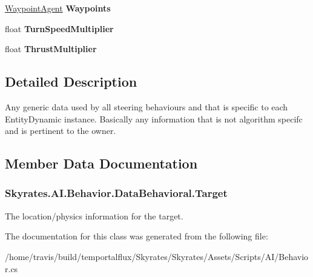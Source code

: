 \begin{DoxyCompactItemize}
\item 
\hypertarget{class_skyrates_1_1_a_i_1_1_behavior_1_1_data_behavioral_a592189455ad128ed20c327e80a13abb6}{\hyperlink{class_skyrates_1_1_a_i_1_1_target_1_1_waypoint_agent}{Waypoint\-Agent} {\bfseries Waypoints}}\label{class_skyrates_1_1_a_i_1_1_behavior_1_1_data_behavioral_a592189455ad128ed20c327e80a13abb6}

\item 
\hypertarget{class_skyrates_1_1_a_i_1_1_behavior_1_1_data_behavioral_a8cbef5bf7accdbe60002994848129e3a}{float {\bfseries Turn\-Speed\-Multiplier}}\label{class_skyrates_1_1_a_i_1_1_behavior_1_1_data_behavioral_a8cbef5bf7accdbe60002994848129e3a}

\item 
\hypertarget{class_skyrates_1_1_a_i_1_1_behavior_1_1_data_behavioral_ab43949c0e7564921d94fec9e3c97f107}{float {\bfseries Thrust\-Multiplier}}\label{class_skyrates_1_1_a_i_1_1_behavior_1_1_data_behavioral_ab43949c0e7564921d94fec9e3c97f107}

\end{DoxyCompactItemize}


\subsection{Detailed Description}
Any generic data used by all steering behaviours and that is specific to each Entity\-Dynamic instance. Basically any information that is not algorithm specifc and is pertinent to the owner. 



\subsection{Member Data Documentation}
\hypertarget{class_skyrates_1_1_a_i_1_1_behavior_1_1_data_behavioral_aabf18c199391e680f75cbe93fdd7d5e6}{
\subsubsection[{Target}]{ Skyrates.\-A\-I.\-Behavior.\-Data\-Behavioral.\-Target}}\label{class_skyrates_1_1_a_i_1_1_behavior_1_1_data_behavioral_aabf18c199391e680f75cbe93fdd7d5e6}


The location/physics information for the target. 



The documentation for this class was generated from the following file\-:\begin{DoxyCompactItemize}
\item 
/home/travis/build/temportalflux/\-Skyrates/\-Skyrates/\-Assets/\-Scripts/\-A\-I/Behavior.\-cs\end{DoxyCompactItemize}
